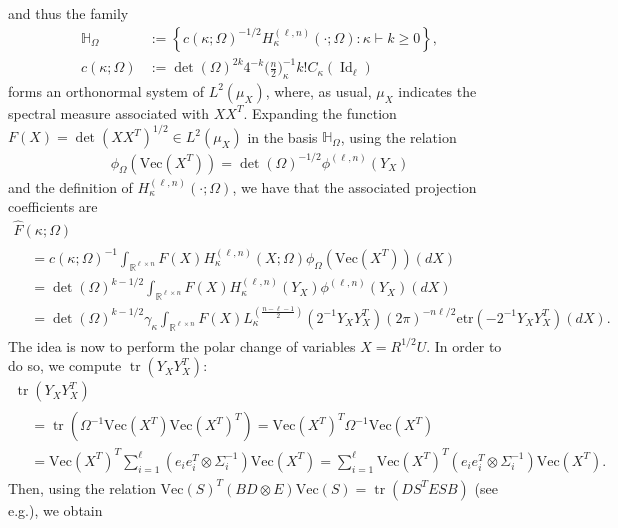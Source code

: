 \documentclass[AHL,Unicode,longabstracts,published]{cedram}
\DeclareMathOperator{\Id}{Id}
\DeclareMathOperator{\Tr}{tr}
\renewcommand{\Vec}{\mathrm{Vec}}
\newcommand{\R}{\mathbb{R}}
\newcommand{\bbH}{\mathbb{H}}
\newcommand{\etr}[1]{\mathrm{etr}\left(#1\right)}
\begin{document}
and thus the family
\begin{align*}
\bbH_{\Omega} &{:=} \left\{ c(\kappa;\Omega)^{-1/2} H_{\kappa}^{(\ell,n)}(\cdot;\Omega): \kappa \vdash k \geq0\right\}, \\
 c(\kappa;\Omega) &{:=}\det(\Omega)^{2 k}4^{-k}\bigg(\frac{n}{2}\bigg)_{\kappa}^{-1} k!C_{\kappa}(\Id_{\ell})
\end{align*}
forms an orthonormal system of $L^2(\mu_{X})$, where, as usual, $\mu_{X}$ indicates the spectral measure associated with $XX^T$. Expanding the function $F(X)=\det(XX^T)^{1/2} \in L^2(\mu_{X})$ in the basis $\bbH_{\Omega}$, using the relation
\begin{gather*}
\phi_{\Omega}\left(\Vec\left(X^T\right)\right) = \det(\Omega)^{-1/2} \phi^{(\ell,n)}(Y_X)
\end{gather*}
and the definition of $H_{\kappa}^{(\ell,n)}(\cdot; \Omega)$, we have that the associated projection coefficients are
\begin{multline*}
\widehat{F}(\kappa;\Omega)\\
\begin{aligned}
&= c(\kappa;\Omega)^{-1}
\int_{\R^{\ell \times n}} F(X) H^{(\ell,n)}_{\kappa}(X;\Omega) \phi_{\Omega}\left(\Vec\left(X^T\right)\right) (dX) \\
&= \det(\Omega)^{k-1/2} \int_{\R^{\ell \times n}} F(X) H_{\kappa}^{(\ell,n)}(Y_X) \phi^{(\ell,n)}(Y_X) (dX)\\
&= \det(\Omega)^{k-1/2} \gamma_{\kappa}
\int_{\R^{\ell \times n}} F(X) L_{\kappa}^{(\frac{n-\ell-1}{2})}\left(2^{-1}Y_XY_X^T\right) (2\pi)^{-n\ell/2}\etr{-2^{-1}Y_XY_X^T} (dX).
\end{aligned}
\end{multline*}
The idea is now to perform the polar change of variables $X= R^{1/2}U$. In order to do so, we compute $\Tr(Y_XY_X^T)$:
\begin{multline*}
\Tr\left(Y_XY_X^T\right)\\
\begin{aligned}
&= \Tr\left(\Omega^{-1} \Vec\left(X^T\right)\Vec\left(X^T\right)^T\right) = \Vec\left(X^T\right)^T \Omega^{-1} \Vec\left(X^T\right) \\
&= \Vec\left(X^T\right)^T \sum_{i=1}^{\ell} \left(e_ie_i^T \otimes \Sigma_i^{-1}\right) \Vec\left(X^T\right) = \sum_{i=1}^{\ell}\Vec\left(X^T\right)^T \left(e_ie_i^T \otimes \Sigma_i^{-1}\right) \Vec\left(X^T\right).
\end{aligned}
\end{multline*}
Then, using the relation $\Vec(S)^T (BD\otimes E) \Vec(S)=\Tr(DS^TESB)$ (see e.g.\linebreak \cite[Theorem~1.2.22]{Gupta2018}), we obtain
\end{document}
